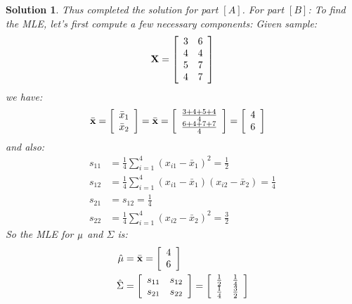 \documentclass[11pt]{article}
\newtheorem{sol}{Solution}
\begin{document}
\begin{sol}
	Thus completed the solution for part $[A]$.
	\vskip 2mm
	For part $[B]$:\vskip 2mm
	To find the MLE, let's first compute a few necessary components:\vskip 2mm
	Given sample:
	\begin{align*}
		{\bf X} = \left[\begin{array}{cc} 3&6  \\  4& 4\\ 5&7 \\ 4&7  \end{array}\right]
	\end{align*}
	we have:
	\begin{align*}
		\bar{{\bf x}} = \left[\begin{array}{c} \bar{x}_1\\ \bar{x}_2\end{array}\right] &= \bar{{\bf x}} = \left[\begin{array}{c} \frac{3 + 4 + 5 + 4}{4}\\ \frac{6+4+7+7}{4}\end{array}\right] = \left[\begin{array}{c} 4\\ 6\end{array}\right]
	\end{align*}
	and also:
	\begin{align*}
		s_{11} &= \frac{1}{4}\sum_{i = 1}^4(x_{i1} - \bar{x}_1)^2 = \frac{1}{2}\\
		s_{12} &= \frac{1}{4}\sum_{i = 1}^4(x_{i1} - \bar{x}_1)(x_{i2} - \bar{x}_2) = \frac{1}{4} \\
		s_{21} &= s_{12} = \frac{1}{4}\\
		s_{22} &= \frac{1}{4}\sum_{i = 1}^4(x_{i2} - \bar{x}_2)^2 = \frac{3}{2}
	\end{align*}
	So the MLE for ${\bf \mu}$ and $\Sigma$ is:
	\begin{align*}
		\hat{{\bf \mu}} &=\bar{{\bf x}} =  \left[\begin{array}{c} 4\\ 6\end{array}\right] \\
		\hat{\Sigma} &= \left[\begin{array}{cc}s_{11}&s_{12} \\s_{21}&s_{22} \end{array}\right] =  \left[\begin{array}{cc}\frac{1}{2}&\frac{1}{4} \\ \frac{1}{4}&\frac{3}{2} \end{array}\right] 
	\end{align*}

\end{sol}
\end{document}
